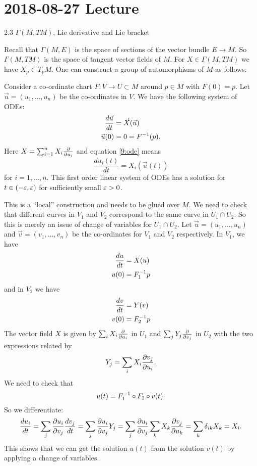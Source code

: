 \section{2018-08-27 Lecture}

2.3 $\Gamma(M,TM)$, Lie derivative and Lie bracket

Recall that $\Gamma(M,E)$ is the space of sections of the vector bundle $E \to M$.
So $\Gamma(M,TM)$ is the space of tangent vector fields of $M$.
For $X \in \Gamma(M,TM)$ we have $X_p \in T_pM$.
One can construct a group of automorphisms of $M$ as follows:

Consider a co-ordinate chart $F: V \to U \subset M$ around $p \in M$ with $F(0)=p$.
Let $\vec u = (u_1,\ldots,u_n)$ be the co-ordinates in $V$.
We have the following system of ODEs:
\begin{align}
  \frac{d\vec u}{dt} &= \vec X(\vec u) \\
  \vec u(0) &= 0 = F^{-1}(p).
  \label{9:ode}
\end{align}
Here $X=\sum_{i=1}^nX_i\tfrac{\partial}{\partial u_i}$ and equation \ref{9:ode} means
\[ \frac{du_i(t)}{dt}=X_i(\vec u(t)) \]
for $i=1,\ldots,n$.
This first order linear system of ODEs has a solution for $t\in(-\varepsilon,\varepsilon)$ for sufficiently small $\varepsilon>0$.

This is a ``local'' construction and needs to be glued over $M$.
We need to check that different curves in $V_1$ and $V_2$ correspond to the same curve in $U_1 \cap U_2$.
So this is merely an issue of change of variables for $U_1 \cap U_2$.
Let $\vec u = (u_1,\ldots,u_n)$ and $\vec v = (v_1,\ldots,v_n)$ be the co-ordinates for $V_1$ and $V_2$ respectively.
In $V_1$, we have
\begin{align*}
  \frac{du}{dt}&=X(u)\\
  u(0)&=F_1^{-1} p
\end{align*}
and in $V_2$ we have
\begin{align*}
  \frac{dv}{dt}&=Y(v)\\
  v(0)&=F_2^{-1} p
\end{align*}
The vector field $X$ is given by $\sum_iX_i\tfrac{\partial}{\partial u_i}$ in $U_1$ and $\sum_jY_j\frac{\partial}{\partial v_j}$ in $U_2$ with the two expressions related by
\[ Y_j=\sum_iX_i\frac{\partial v_j}{\partial u_i}. \]
We need to check that
\[ u(t)=F_1^{-1} \circ F_2 \circ v(t). \]
So we differentiate:
\[ \frac{du_i}{dt} = \sum_j \frac{\partial u_i}{\partial v_j} \frac{dv_j}{dt} = \sum_j \frac{\partial u_i}{\partial v_j} Y_j = \sum_j \frac{\partial u_i}{\partial v_j} \sum_k X_k \frac{\partial v_j}{\partial u_k} = \sum_k \delta_{ik} X_k = X_i. \]
This shows that we can get the solution $u(t)$ from the solution $v(t)$ by applying a change of variables.

